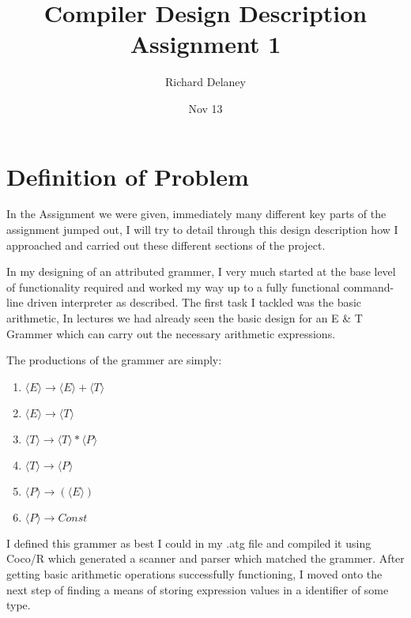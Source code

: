 \documentclass{article}
\title{ Compiler Design Description Assignment 1}
\author{ Richard Delaney}
\date{ Nov 13}
\begin{document}
 \maketitle 


\section*{ Definition of Problem}


In the Assignment we were given, immediately many different key parts of the assignment jumped out, I will try to detail through this design description how I approached and carried out these different sections of the project.



In my designing of an attributed grammer, I very much started at the base level of functionality required and worked my way up to a fully functional command-line driven interpreter as described. The first task I tackled was the basic arithmetic, In lectures we had already seen the basic design for an E & T Grammer which can carry out the necessary arithmetic expressions. 



The productions of the grammer are simply:



\begin{enumerate}
\item   $\langle E \rangle  \rightarrow  \langle E \rangle  +  \langle T \rangle$
\item   $\langle E \rangle  \rightarrow  \langle T \rangle$
\item   $\langle T \rangle  \rightarrow  \langle T \rangle  *  \langle P \rangle $
\item   $\langle T \rangle  \rightarrow  \langle P \rangle$ 
\item   $\langle P \rangle  \rightarrow (  \langle E \rangle  )$
\item   $\langle P \rangle  \rightarrow Const $
\end{enumerate}


I defined this grammer as best I could in my .atg file and compiled it using Coco/R which generated a scanner and parser which matched the grammer. After getting basic arithmetic operations successfully functioning, I moved onto the next step of finding a means of storing expression values in a identifier of some type. 
\end{document}
